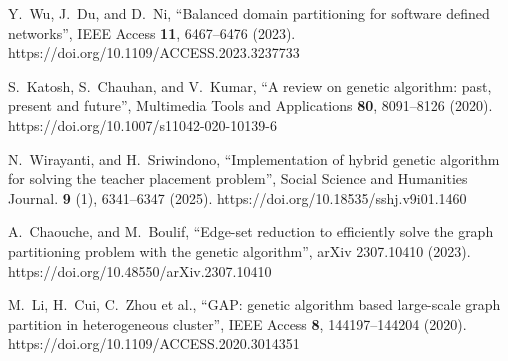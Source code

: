 \documentclass[
11pt,%
tightenlines,%
twoside,%
onecolumn,%
nofloats,%
nobibnotes,%
nofootinbib,%
superscriptaddress,%
noshowpacs,%
centertags]%
{revtex4}
\begin{document}
\begin{thebibliography}{99}
Y.~Wu, J.~Du, and D.~Ni, \textquotedblleft Balanced domain partitioning for software defined networks\textquotedblright, IEEE Access \textbf{11}, 6467--6476 (2023). https://doi.org/10.1109/ACCESS.2023.3237733

S.~Katosh, S.~Chauhan, and V.~Kumar, \textquotedblleft A review on genetic algorithm: past, present and future\textquotedblright, Multimedia Tools and Applications \textbf{80}, 8091--8126 (2020). https://doi.org/10.1007/s11042-020-10139-6

N.~Wirayanti, and H.~Sriwindono, \textquotedblleft Implementation of hybrid genetic algorithm for solving the teacher placement problem\textquotedblright, Social Science and Humanities Journal. \textbf{9} (1), 6341--6347 (2025). https://doi.org/10.18535/sshj.v9i01.1460

A.~Chaouche, and M.~Boulif, \textquotedblleft Edge-set reduction to efficiently solve the graph partitioning problem with the genetic algorithm\textquotedblright, arXiv 2307.10410 (2023). https://doi.org/10.48550/arXiv.2307.10410

M.~Li, H.~Cui, C.~Zhou et al., \textquotedblleft GAP: genetic algorithm based large-scale graph partition in heterogeneous cluster\textquotedblright, IEEE Access \textbf{8}, 144197--144204 (2020). https://doi.org/10.1109/ACCESS.2020.3014351

\end{thebibliography}
\end{document}
